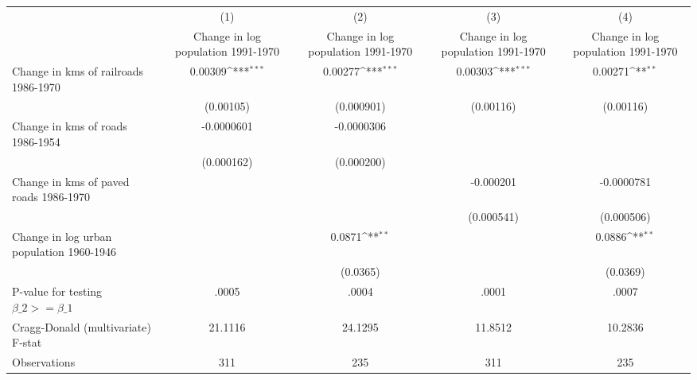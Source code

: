 {
\def\sym#1{\ifmmode^{#1}\else\(^{#1}\)\fi}
\begin{tabular}{l*{4}{c}}
\hline\hline
                &\multicolumn{1}{c}{(1)}&\multicolumn{1}{c}{(2)}&\multicolumn{1}{c}{(3)}&\multicolumn{1}{c}{(4)}\\
                &\multicolumn{1}{c}{Change in log population 1991-1970}&\multicolumn{1}{c}{Change in log population 1991-1970}&\multicolumn{1}{c}{Change in log population 1991-1970}&\multicolumn{1}{c}{Change in log population 1991-1970}\\
\hline
Change in kms of railroads 1986-1970&  0.00309\sym{***}&  0.00277\sym{***}&  0.00303\sym{***}&  0.00271\sym{**} \\
                &(0.00105)         &(0.000901)         &(0.00116)         &(0.00116)         \\
[1em]
Change in kms of roads 1986-1954&-0.0000601         &-0.0000306         &                  &                  \\
                &(0.000162)         &(0.000200)         &                  &                  \\
[1em]
Change in kms of paved roads 1986-1970&                  &                  &-0.000201         &-0.0000781         \\
                &                  &                  &(0.000541)         &(0.000506)         \\
[1em]
Change in log urban population 1960-1946&                  &   0.0871\sym{**} &                  &   0.0886\sym{**} \\
                &                  & (0.0365)         &                  & (0.0369)         \\
\hline
P-value for testing $\beta\_{2} >= \beta\_{1}$&    .0005         &    .0004         &    .0001         &    .0007         \\
Cragg-Donald (multivariate) F-stat&  21.1116         &  24.1295         &  11.8512         &  10.2836         \\
Observations    &      311         &      235         &      311         &      235         \\
\hline\hline
\end{tabular}
}

